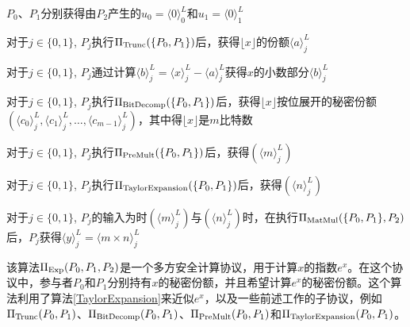 \begin{algorithm}[H]
	\SetAlgoLined
	
	
	$P_0$、$P_1$分别获得由$P_2$产生的$u_0=\langle 0\rangle_0^L$和$u_1=\langle 0\rangle_1^L$
	
	对于$j\in \{0, 1\}$, $P_j$执行$\Pi_{\rm Trunc}(\{P_0, P_1\})$后，获得$\lfloor x \rfloor$的份额$\langle a\rangle_j^L$
	
	对于$j\in \{0, 1\}$, $P_j$通过计算$\langle b\rangle_j^L = \langle x\rangle_j^L - \langle a\rangle_j^L$获得$x$的小数部分$\langle b\rangle_j^L$
	
	对于$j\in \{0, 1\}$, $P_j$执行$\Pi_{\rm BitDecomp}(\{P_0, P_1\})$后，获得$\lfloor x \rfloor$按位展开的秘密份额$(\langle c_0\rangle_j^L, \langle c_1\rangle_j^L, \dots, \langle c_{m-1}\rangle_j^L)$，其中得$\lfloor x \rfloor$是$m$比特数
	
	
	
	对于$j\in \{0, 1\}$, $P_j$执行$\Pi_{\rm PreMult}(\{P_0, P_1\})$后，获得$(\langle m\rangle_j^L)$
	
	对于$j\in \{0, 1\}$, $P_j$执行$\Pi_{\rm TaylorExpansion}(\{P_0, P_1\})$后，获得$(\langle n\rangle_j^L)$
	
	对于$j\in \{0, 1\}$, $P_j$的输入为时$(\langle m\rangle_j^L)$与$(\langle n\rangle_j^L)$时，在执行$\Pi_{\rm MatMul}(\{P_0, P_1\}, P_2)$后，$P_j$获得$\langle y\rangle_j^L=\langle m\times n\rangle_j^L$
	
	\caption{ $\Pi_{\rm Exp}(\{P_0, P_1\}, P_2)$ }
	\label{Exp}
\end{algorithm}

该算法$\Pi_{\rm Exp}({P_0, P_1}, P_2)$是一个多方安全计算协议，用于计算$x$的指数$e^x$。在这个协议中，参与者$P_0$和$P_1$分别持有$x$的秘密份额，并且希望计算$e^x$的秘密份额。这个算法利用了算法\ref{TaylorExpansion}来近似$e^x$，以及一些前述工作\cite{MPC_Fix_Point}的子协议，例如$\Pi_{\rm Trunc}({P_0, P_1})$、$\Pi_{\rm BitDecomp}({P_0, P_1})$、$\Pi_{\rm PreMult}({P_0, P_1})$和$\Pi_{\rm TaylorExpansion}({P_0, P_1})$。


